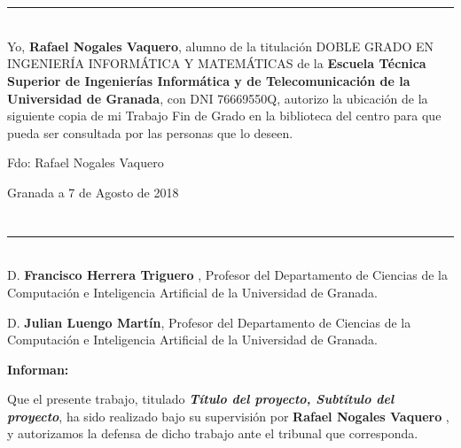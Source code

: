 \chapter*{}
\thispagestyle{empty}

\noindent\rule[-1ex]{\textwidth}{2pt}\\[4.5ex]

Yo, \textbf{Rafael Nogales Vaquero}, alumno de la titulación DOBLE GRADO EN INGENIERÍA INFORMÁTICA Y MATEMÁTICAS de la \textbf{Escuela Técnica Superior
de Ingenierías Informática y de Telecomunicación de la Universidad de Granada}, con DNI 76669550Q, autorizo la
ubicación de la siguiente copia de mi Trabajo Fin de Grado en la biblioteca del centro para que pueda ser
consultada por las personas que lo deseen.

\vspace{6cm}

\noindent Fdo: Rafael Nogales Vaquero

\vspace{2cm}

\begin{flushright}
Granada a 7 de Agosto de 2018
\end{flushright}


\chapter*{}
\thispagestyle{empty}

\noindent\rule[-1ex]{\textwidth}{2pt}\\[4.5ex]

D. \textbf{Francisco Herrera Triguero  }, Profesor del Departamento de Ciencias de la Computación e Inteligencia Artificial  de la Universidad de Granada.

\vspace{0.5cm}

D. \textbf{Julian Luengo Martín}, Profesor del Departamento de Ciencias de la Computación e Inteligencia Artificial  de la Universidad de Granada.


\vspace{0.5cm}

\textbf{Informan:}

\vspace{0.5cm}

Que el presente trabajo, titulado \textit{\textbf{Título del proyecto, Subtítulo del proyecto}},
ha sido realizado bajo su supervisión por \textbf{Rafael Nogales Vaquero }, y autorizamos la defensa de dicho trabajo ante el tribunal
que corresponda.

